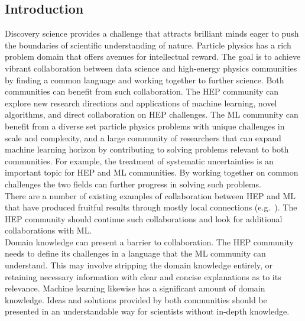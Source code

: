 

\subsection{Introduction}


Discovery science provides a challenge that attracts brilliant minds eager to push the boundaries of scientific understanding of nature. Particle physics has a rich problem domain that offers avenues for intellectual reward. The goal is to achieve vibrant collaboration between data science and high-energy physics communities by finding a common language and working together to further science.
Both communities can benefit from such collaboration. The HEP community can explore new research directions and applications of machine learning, novel algorithms, and direct collaboration on HEP challenges. The ML community can benefit from a diverse set particle physics problems with unique challenges in scale and complexity, and a large community of researchers that can expand machine learning horizon by contributing to solving problems relevant to both communities. For example, the treatment of systematic uncertainties is an important topic for HEP and ML communities. By working together on common challenges the two fields can further progress in solving such problems.\\

There are a number of existing examples of collaboration between HEP and ML that have produced fruitful results through mostly local connections (e.g.~\cite{Likhomanenko:2016tgu,Paganini:2017hrr}). The HEP community should continue such collaborations and look for additional collaborations with ML.\\

Domain knowledge can present a barrier to collaboration. The HEP community needs to define its challenges in a language that the ML community can understand. This may involve stripping the domain knowledge entirely, or retaining necessary information with clear and concise explanations as to its relevance. Machine learning likewise has a significant amount of domain knowledge. Ideas and solutions provided by both communities should be presented in an understandable way for scientists without in-depth knowledge.

